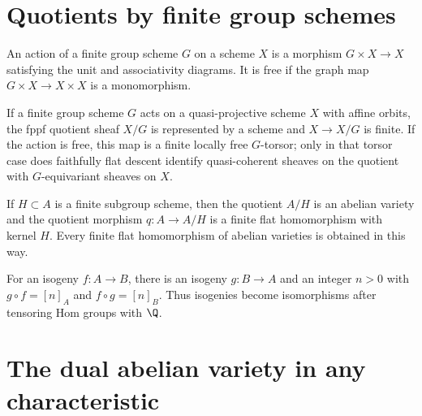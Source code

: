 \section{Quotients by finite group schemes}
\label{mumford-III12}

\begin{definition}
\label{mumford-def-group-scheme-action}
An action of a finite group scheme $G$ on a scheme $X$ is a morphism
$G\times X\to X$ satisfying the unit and associativity diagrams.  It is free
if the graph map $G\times X\to X\times X$ is a monomorphism.
\notready
\end{definition}

\begin{theorem}
\label{mumford-thm-finite-groupscheme-quotient}
If a finite group scheme $G$ acts on a quasi-projective scheme $X$ with affine
orbits, the fppf quotient sheaf $X/G$ is represented by a scheme and
$X\to X/G$ is finite.  If the action is free, this map is a finite locally
free $G$-torsor; only in that torsor case does faithfully flat descent identify
quasi-coherent sheaves on the quotient with $G$-equivariant sheaves on $X$.
\notready
\end{theorem}

\begin{proposition}
\label{mumford-prop-abelian-quotient}
If $H\subset A$ is a finite subgroup scheme, then the quotient $A/H$ is an
abelian variety and the quotient morphism $q:A\to A/H$ is a finite flat
homomorphism with kernel $H$.  Every finite flat homomorphism of abelian
varieties is obtained in this way.
\notready
\end{proposition}

\begin{theorem}
\label{mumford-thm-isogeny-factorization}
For an isogeny $f:A\to B$, there is an isogeny $g:B\to A$ and an integer
$n>0$ with $g\circ f=[n]_A$ and $f\circ g=[n]_B$.  Thus isogenies become
isomorphisms after tensoring Hom groups with $\Q$.
\notready
\end{theorem}

\section{The dual abelian variety in any characteristic}
\label{mumford-III13}


